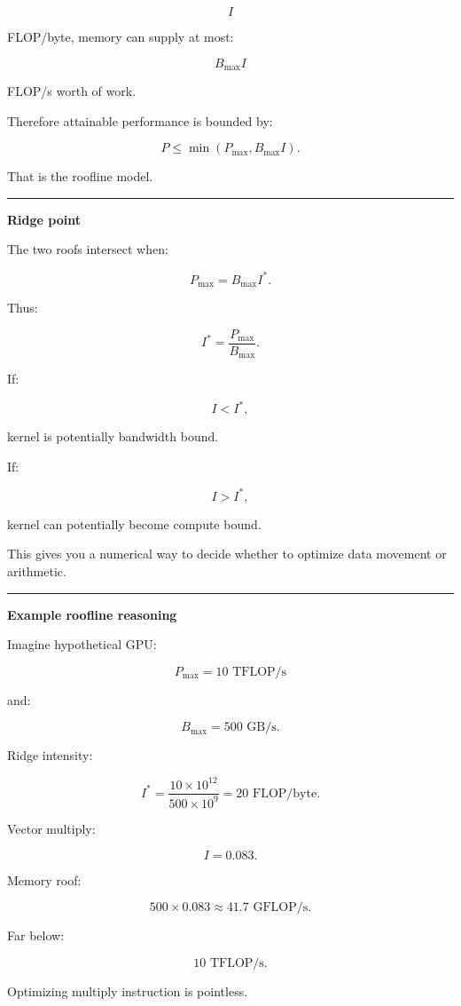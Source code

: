 \[
I
\]

FLOP/byte, memory can supply at most:

\[
B_{\max}I
\]

FLOP/s worth of work.

Therefore attainable performance is bounded by:

\[
\boxed{
P
\le
\min(
P_{\max},
B_{\max}I
).
}
\]

That is the roofline model.

\begin{center}\rule{0.5\linewidth}{0.5pt}\end{center}

\textbf{Ridge point}

The two roofs intersect when:

\[
P_{\max}
=
B_{\max}I^*.
\]

Thus:

\[
\boxed{
I^*
=
\frac{
P_{\max}
}{
B_{\max}
}.
}
\]

If:

\[
I<I^*,
\]

kernel is potentially bandwidth bound.

If:

\[
I>I^*,
\]

kernel can potentially become compute bound.

This gives you a numerical way to decide whether to optimize data movement or arithmetic.

\begin{center}\rule{0.5\linewidth}{0.5pt}\end{center}

\textbf{Example roofline reasoning}

Imagine hypothetical GPU:

\[
P_{\max}=10\text{ TFLOP/s}
\]

and:

\[
B_{\max}=500\text{ GB/s}.
\]

Ridge intensity:

\[
I^*
=
\frac{
10\times10^{12}
}{
500\times10^9
}
=
20\text{ FLOP/byte}.
\]

Vector multiply:

\[
I=0.083.
\]

Memory roof:

\[
500\times0.083
\approx41.7\text{ GFLOP/s}.
\]

Far below:

\[
10\text{ TFLOP/s}.
\]

Optimizing multiply instruction is pointless.

